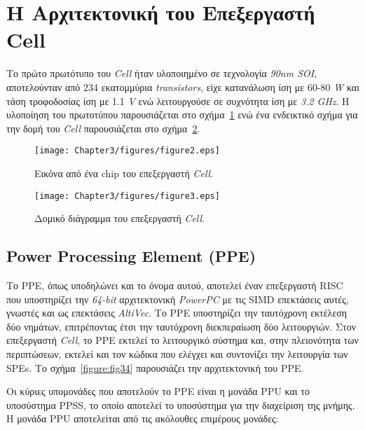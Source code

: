 \section{Η Αρχιτεκτονική του Επεξεργαστή Cell}
\label{section:sect32}
\indent
Το πρώτο πρωτότυπο του \textsl{Cell} ήταν υλοποιημένο σε τεχνολογία \textsl{90nm SOI}, αποτελούνταν από 234 εκατομμύρια \textsl{transistors}, είχε κατανάλωση ίση με 60-80 \textsl{W} και τάση τροφοδοσίας ίση με 1.1 \textsl{V} ενώ λειτουργούσε σε συχνότητα ίση με \textsl{3.2 GHz}. Η υλοποίηση του πρωτοτύπου παρουσιάζεται στο σχήμα~\ref{figure:fig32} \cite{CellProject} ενώ ένα ενδεικτικό σχήμα για την δομή του \textsl{Cell} παρουσιάζεται στο σχήμα~\ref{figure:fig33}.
\begin{figure}[b]
\centering
\texttt{[image: Chapter3/figures/figure2.eps]}
\caption{Εικόνα από ένα chip του επεξεργαστή \textsl{Cell}.}
\label{figure:fig32}
\end{figure}

\begin{figure}[b]
\centering
\texttt{[image: Chapter3/figures/figure3.eps]}
\caption{Δομικό διάγραμμα του επεξεργαστή \textsl{Cell}.}
\label{figure:fig33}
\end{figure}

\subsection[3.2.1 Power Processing Element (PPE)]{Power Processing Element (PPE)}
\label{subsection:sub321}
\indent
Το \acf{PPE}, όπως υποδηλώνει και το όνομα αυτού, αποτελεί έναν επεξεργαστή \ac{RISC} που υποστηρίζει την \textsl{64-bit} αρχιτεκτονική \textsl{PowerPC} με τις \ac{SIMD} επεκτάσεις αυτές, γνωστές και ως επεκτάσεις \textsl{AltiVec}. Το \ac{PPE} υποστηρίζει την ταυτόχρονη εκτέλεση δύο νημάτων, επιτρέποντας έτσι την ταυτόχρονη διεκπεραίωση δύο λειτουργιών. Στον επεξεργαστή \textsl{Cell}, το \ac{PPE} εκτελεί το λειτουργικό σύστημα και, στην πλειονότητα των περιπτώσεων, εκτελεί και τον κώδικα που ελέγχει και συντονίζει την λειτουργία των \acp{SPE}. Το σχήμα~\ref{figure:fig34} παρουσιάζει την αρχιτεκτονική του \ac{PPE}.

\indent
Οι κύριες υπομονάδες που αποτελούν το \ac{PPE} είναι η μονάδα \acf{PPU} και το υποσύστημα \acf{PPSS}, το οποίο αποτελεί το υποσύστημα για την διαχείριση της μνήμης. Η μονάδα \ac{PPU} αποτελείται από τις ακόλουθες επιμέρους μονάδες:

